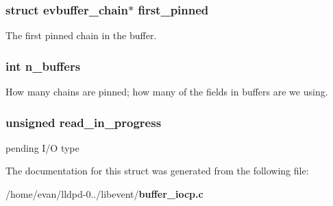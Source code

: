 \subsubsection[{first\-\_\-pinned}]{\setlength{\rightskip}{0pt plus 5cm}struct {\bf evbuffer\-\_\-chain}$\ast$ {\bf first\-\_\-pinned}}\label{structevbuffer__overlapped_afa59f83f34c81f28d71271be39fc2601}
\-The first pinned chain in the buffer. 
\subsubsection[{n\-\_\-buffers}]{\setlength{\rightskip}{0pt plus 5cm}int {\bf n\-\_\-buffers}}\label{structevbuffer__overlapped_a43cf6459f3ae558bca3a5b76a437f745}
\-How many chains are pinned; how many of the fields in buffers are we using. 
\subsubsection[{read\-\_\-in\-\_\-progress}]{\setlength{\rightskip}{0pt plus 5cm}unsigned {\bf read\-\_\-in\-\_\-progress}}\label{structevbuffer__overlapped_a42ee797ba885a54afac61ff9bb876bcf}
pending \-I/\-O type 

\-The documentation for this struct was generated from the following file\-:\begin{DoxyCompactItemize}
\item 
/home/evan/lldpd-\/0../libevent/{\bf buffer\-\_\-iocp.\-c}\end{DoxyCompactItemize}
